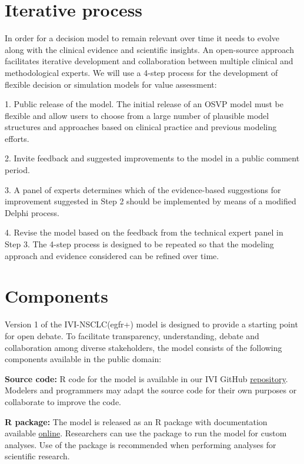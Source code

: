 \documentclass[11pt,final,fleqn]{article}\usepackage[]{graphicx}\usepackage[]{color}
\theoremstyle{plain}
\newcommand\R{{\textsf{R}}}
\begin{document}
{\section{Iterative process}\label{sec:process}
In order for a decision model to remain relevant over time it needs to evolve along with the clinical evidence and scientific insights. An open-source approach facilitates iterative development and collaboration between multiple clinical and methodological experts. We will use a 4-step process for the development of flexible decision or simulation models for value assessment:

1.	Public release of the model. The initial release of an OSVP model must be flexible and allow users to choose from a large number of plausible model structures and approaches based on clinical practice and previous modeling efforts.

2.	Invite feedback and suggested improvements to the model in a public comment period.

3.	A panel of experts determines which of the evidence-based suggestions for improvement suggested in Step 2 should be implemented by means of a modified Delphi process.

4.	Revise the model based on the feedback from the technical expert panel in Step 3. The 4-step process is designed to be repeated so that the modeling approach and evidence considered can be refined over time. 


\section{Components}\label{sec:components}
Version 1 of the IVI-NSCLC(egfr+) model is designed to provide a starting point for open debate. To facilitate transparency, understanding, debate and collaboration among diverse stakeholders, the model consists of the following components available in the public domain:

\textbf{Source code:} \R{} code for the model is available in our IVI GitHub \href{https://github.com/InnovationValueInitiative/IVI-NSCLC}{repository}. Modelers and programmers may adapt the source code for their own purposes or collaborate to improve the code.

\textbf{\R{} package:} The model is released as an \R{} package with documentation available \href{https://innovationvalueinitiative.github.io/IVI-NSCLC/}{online}. Researchers can use the package to run the model for custom analyses. Use of the package is recommended when performing analyses for scientific research.

}
\end{document}
